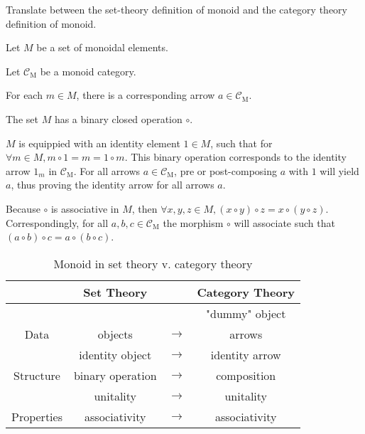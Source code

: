 \begin{ttta}
Translate between the set-theory definition of monoid and the category theory
definition of monoid.
\end{ttta}
\begin{proofitem}
    \item Let $M$ be a set of monoidal elements.
    \item Let $\mathcal{C}_\text{M}$ be a monoid category.
    \item For each $m\in M$, there is a corresponding arrow $a\in
        \mathcal{C}_\text{M}$.
    \item The set $M$ has a binary closed operation $\circ$.
    \item $M$ is equippied with an identity element $1\in M$, such that for
        $\forall m \in M, m\circ 1 = m = 1 \circ m$. This binary operation
        corresponds to the identity arrow $1_m$ in $\mathcal{C}_\text{M}$. For
        all arrows $a\in\mathcal{C}_\text{M}$, pre or post-composing $a$ with
        $1$ will yield $a$, thus proving the identity arrow for all arrows $a$.
    \item Because $\circ$ is associative in $M$, then $\forall x, y, z \in M,
        (x\circ y)\circ z = x\circ(y\circ z)$. Correspondingly, for all $a, b, c\in
        \mathcal{C}_\text{M}$ the morphism $\circ$ will associate such that
        $(a\circ b)\circ c= a\circ(b\circ c)$.
\end{proofitem}
\begin{table}
    \centering
    \begin{tabular}{ c|ccc }
    \hline
    & Set Theory & & Category Theory \\ \hline
    & & & "dummy" object \\
    Data & objects & $\rightarrow$ & arrows \\ \hline
    & identity object & $\rightarrow$ & identity arrow \\
    Structure & binary operation & $\rightarrow$ & composition \\ \hline
    & unitality & $\rightarrow$ & unitality \\
    Properties & associativity& $\rightarrow$ & associativity
    \\\hline
    \end{tabular}
    \caption{Monoid in set theory v. category theory}
\end{table}

